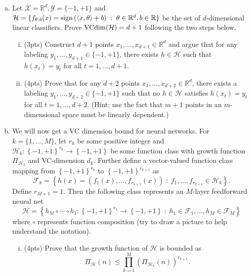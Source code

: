 \documentclass[11pt]{article}
\newcommand{\calX}{{\mathcal{X}}}
\newcommand{\calY}{{\mathcal{Y}}}
\newcommand{\calH}{{\mathcal{H}}}
\newcommand{\calF}{{\mathcal{F}}}
\newcommand{\VC}{{\text{\rm VCdim}}}
\newcommand{\blue}[1]{{\color{blue}#1}}
\newcommand{\R}{\mathbb{R}}
\newcommand{\cbr}[1]{\left\{#1\right\}}
\newcommand{\rbr}[1]{\left(#1\right)}
\newcommand{\inner}[2]{\left\langle #1,#2 \right\rangle}
\newcommand{\sign}{{\text{\rm sign}}}
\begin{document}
\begin{enumerate}[(a)]
\vspace{5pt}
\item 
Let $\calX = \R^d, \calY = \{-1,+1\} $ and $\calH = \{f_{\theta,b}(x) =  \sign\rbr{\inner{x}{\theta}+b} \;:\; \theta \in \R^d, b \in \R\}$ be the set of $d$-dimensional linear classifiers.
Prove $\VC(\calH) = d+1$ following the two steps below.

\begin{enumerate}[(i)]
\item (\blue{3pts}) 
Construct $d+1$ points $x_1, \ldots, x_{d+1} \in \R^d$ and argue that for any labeling $y_1, \ldots, y_{d+1} \in \{-1,+1\}$, there exists $h \in \calH$ such that $h(x_t) = y_t$ for all $t = 1, \ldots, d+1$. \\

\item (\blue{4pts}) 
Prove that for any $d+2$ points $x_1, \ldots, x_{d+2} \in \R^d$, there exists a labeling $y_1, \ldots, y_{d+2} \in \{-1,+1\}$ such that no $h\in\calH$ satisfies $h(x_t) = y_t$ for all $t = 1, \ldots, d+2$. 
(Hint: use the fact that $m+1$ points in an $m$-dimensional space must be linearly dependent.)\\

\end{enumerate}

\vspace{5pt}
\item We will now get a VC dimension bound for neural networks.   For $k=\{1, \ldots, M\}$, let $r_k$ be some positive integer and $\calH_k: \cbr{-1,+1}^{r_k} \rightarrow \cbr{-1,+1}$ be some function class with growth function $\Pi_{\calH_k}$ and VC-dimension $d_k$.
Further define a vector-valued function class mapping from $\cbr{-1,+1}^{r_k}$ to $\cbr{-1,+1}^{r_{k+1}}$ as
\[
\calF_k = \cbr{h(x) = (f_1(x), \ldots, f_{r_{k+1}}(x)) \;:\; f_1, \ldots, f_{r_{k+1}} \in \calH_k}.
\]
Define $r_{M+1} = 1$.
Then the following class represents an $M$-layer feedforward neural net
\[
\calH = \cbr{h_M \circ \cdots \circ h_1 :  \cbr{-1,+1}^{r_1} \rightarrow \cbr{-1,+1}\;:\; h_1 \in \calF_1, \ldots, h_M \in \calF_M}
\]
where $\circ$ represents function composition (try to draw a picture to help understand  the notation).

\begin{enumerate}[(i)]
\item (\blue{4pts}) 
Prove that the growth function of $\calH$ is bounded as \[\Pi_\calH(n) \leq \prod_{k=1}^M \rbr{\Pi_{\calH_k}(n)}^{r_{k+1}}.\] 


\end{enumerate}
\end{enumerate}
\end{document}
